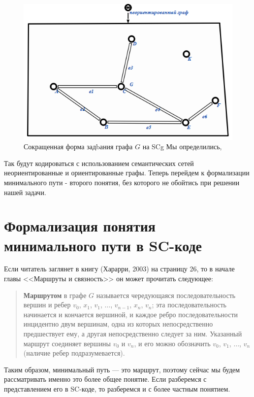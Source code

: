 \begin{figure}[h!]
  \centering
  \includegraphics[scale=0.6]{images/2/Undirected_graph_Short_form}
  \caption{Сокращенная форма задbания графа $G$ на SCg Мы определились,}
  \label{fig:Undirected_graph_Short_form}
\end{figure}

Так будут кодироваться с использованием семантических сетей
неориентированные и ориентированные графы. Теперь перейдем к
формализации минимального пути - второго понятия, без которого не
обойтись при решении нашей задачи.

\section{Формализация понятия минимального пути в SC-коде}

Если читатель заглянет в книгу (Харарри, 2003) на страницу 26, то в
начале главы <<Маршруты и связность>> он может прочитать следующее:


\begin{quotation}
  \textbf{Маршрутом} в графе $G$ называется чередующаяся
  последовательность вершин и ребер $v_0$, $x_1$, $v_1$, $\dotsc$,
  $v_{n-1}$, $x_n$, $v_n$; эта последовательность начинается и
  кончается вершиной, и каждое ребро последовательности инцидентно
  двум вершинам, одна из которых непосредственно предшествует ему, а
  другая непосредственно следует за ним. Указанный маршрут соединяет
  вершины $v_0$ и $v_n$, и его можно обозначить $v_0$, $v_1$, $\dotsc$,
  $v_n$ (наличие ребер подразумевается).
\end{quotation}

Таким образом, минимальный путь — это маршрут, поэтому сейчас мы будем
рассматривать именно это более общее понятие. Если разберемся с
представлением его в SC-коде, то разберемся и с более частным
понятием.

